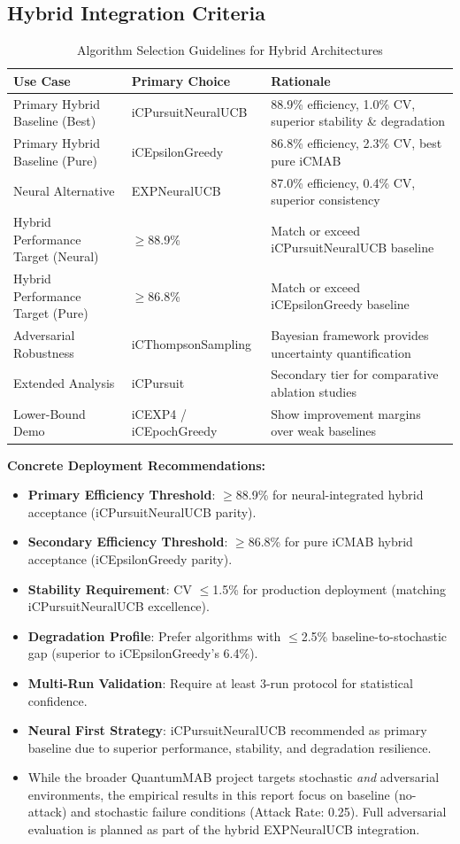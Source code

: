 \documentclass[12pt,a4paper]{article}
\begin{document}
\subsection{Hybrid Integration Criteria}

\begin{table}[H]
\centering
\caption{Algorithm Selection Guidelines for Hybrid Architectures}
\begin{tabular}{@{}lll@{}}
\toprule
\textbf{Use Case} & \textbf{Primary Choice} & \textbf{Rationale} \\
\midrule
Primary Hybrid Baseline (Best) & iCPursuitNeuralUCB & 88.9\% efficiency, 1.0\% CV, superior stability \& degradation \\
Primary Hybrid Baseline (Pure) & iCEpsilonGreedy & 86.8\% efficiency, 2.3\% CV, best pure iCMAB \\
Neural Alternative & EXPNeuralUCB & 87.0\% efficiency, 0.4\% CV, superior consistency \\
Hybrid Performance Target (Neural) & $\geq$88.9\% & Match or exceed iCPursuitNeuralUCB baseline \\
Hybrid Performance Target (Pure) & $\geq$86.8\% & Match or exceed iCEpsilonGreedy baseline \\
Adversarial Robustness & iCThompsonSampling & Bayesian framework provides uncertainty quantification \\
Extended Analysis & iCPursuit & Secondary tier for comparative ablation studies \\
Lower-Bound Demo & iCEXP4 / iCEpochGreedy & Show improvement margins over weak baselines \\
\bottomrule
\end{tabular}
\end{table}

\textbf{Concrete Deployment Recommendations:}
\begin{itemize}
\item \textbf{Primary Efficiency Threshold}: $\geq$88.9\% for neural-integrated hybrid acceptance (iCPursuitNeuralUCB parity).
\item \textbf{Secondary Efficiency Threshold}: $\geq$86.8\% for pure iCMAB hybrid acceptance (iCEpsilonGreedy parity).
\item \textbf{Stability Requirement}: CV $\leq$1.5\% for production deployment (matching iCPursuitNeuralUCB excellence).
\item \textbf{Degradation Profile}: Prefer algorithms with $\leq$2.5\% baseline-to-stochastic gap (superior to iCEpsilonGreedy's 6.4\%).
\item \textbf{Multi-Run Validation}: Require at least 3-run protocol for statistical confidence.
\item \textbf{Neural First Strategy}: iCPursuitNeuralUCB recommended as primary baseline due to superior performance, stability, and degradation resilience.
\item While the broader QuantumMAB project targets stochastic \emph{and} adversarial environments, the empirical results in this report focus on baseline (no-attack) and stochastic failure conditions (Attack Rate: 0.25). Full adversarial evaluation is planned as part of the hybrid EXPNeuralUCB integration.
\end{itemize}
\end{document}
